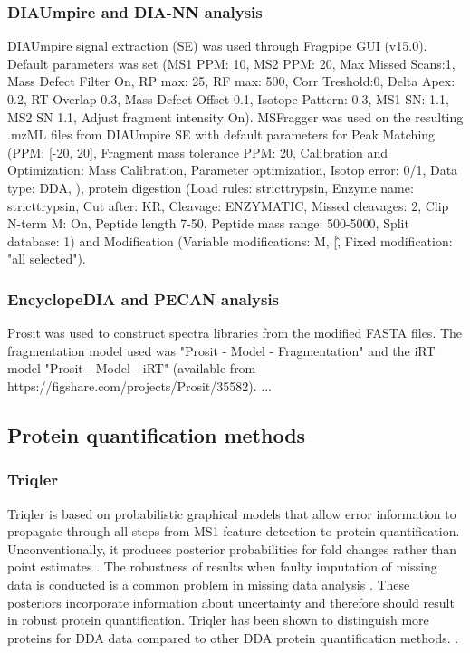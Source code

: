 \documentclass[10pt,letterpaper]{article}
\begin{document}
{\subsubsection*{DIAUmpire and DIA-NN analysis}
DIAUmpire signal extraction (SE) was used through Fragpipe GUI (v15.0). Default parameters was set (MS1 PPM: 10, MS2 PPM: 20, Max Missed Scans:1, Mass Defect Filter On, RP max: 25, RF max: 500, Corr Treshold:0, Delta Apex: 0.2, RT Overlap 0.3, Mass Defect Offset 0.1, Isotope Pattern: 0.3, MS1 SN: 1.1, MS2 SN 1.1, Adjust fragment intensity On). MSFragger was used on the resulting .mzML files from DIAUmpire SE with default parameters for Peak Matching (PPM: [-20, 20], Fragment mass tolerance PPM: 20, Calibration and Optimization: Mass Calibration, Parameter optimization, Isotop error: 0/1, Data type: DDA, ), protein digestion (Load rules: stricttrypsin, Enzyme name: stricttrypsin, Cut after: KR, Cleavage: ENZYMATIC, Missed cleavages: 2, Clip N-term M: On, Peptide length 7-50, Peptide mass range: 500-5000, Split database: 1) and Modification (Variable modifications: M, \/[\^, Fixed modification: "all selected"). 

\subsubsection*{EncyclopeDIA and PECAN analysis}
Prosit was used to construct spectra libraries from the modified FASTA files. The fragmentation model used was "Prosit - Model - Fragmentation" and the iRT model "Prosit - Model - iRT" (available from https://figshare.com/projects/Prosit/35582).
...

\subsection*{Protein quantification methods}

\subsubsection*{Triqler}

Triqler is based on probabilistic graphical models that allow error information to propagate through all steps from MS1 feature detection to protein quantification. Unconventionally, it produces posterior probabilities for fold changes rather than point estimates \cite{The2018Integrated}. The robustness of results when faulty imputation of missing data is conducted is a common problem in missing data analysis \cite{ma2018bayesian}. These posteriors incorporate information about uncertainty and therefore should result in robust protein quantification. Triqler has been shown to distinguish more proteins for DDA data compared to other DDA protein quantification methods. \cite{The2018Integrated}. 

}
\end{document}

